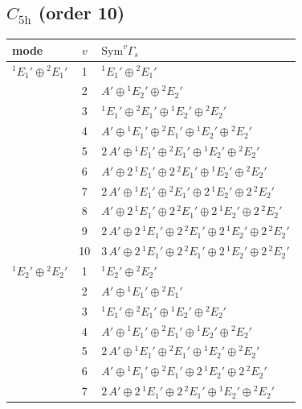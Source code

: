 \documentclass[11pt]{article}
\begin{document}
\subsection*{$C_{5\mathrm{h}}$ \quad (order 10)}
\begin{longtable}{l c p{}}
\hline mode & $v$ & $\mathrm{Sym}^v\Gamma_s$\\ \hline\endhead
${}^{1}E_{1}'\oplus {}^{2}E_{1}'$ & 1 & ${}^{1}E_{1}'\oplus {}^{2}E_{1}'$\\
 & 2 & $A'\oplus {}^{1}E_{2}'\oplus {}^{2}E_{2}'$\\
 & 3 & ${}^{1}E_{1}'\oplus {}^{2}E_{1}'\oplus {}^{1}E_{2}'\oplus {}^{2}E_{2}'$\\
 & 4 & $A'\oplus {}^{1}E_{1}'\oplus {}^{2}E_{1}'\oplus {}^{1}E_{2}'\oplus {}^{2}E_{2}'$\\
 & 5 & $2\,A'\oplus {}^{1}E_{1}'\oplus {}^{2}E_{1}'\oplus {}^{1}E_{2}'\oplus {}^{2}E_{2}'$\\
 & 6 & $A'\oplus 2\,{}^{1}E_{1}'\oplus 2\,{}^{2}E_{1}'\oplus {}^{1}E_{2}'\oplus {}^{2}E_{2}'$\\
 & 7 & $2\,A'\oplus {}^{1}E_{1}'\oplus {}^{2}E_{1}'\oplus 2\,{}^{1}E_{2}'\oplus 2\,{}^{2}E_{2}'$\\
 & 8 & $A'\oplus 2\,{}^{1}E_{1}'\oplus 2\,{}^{2}E_{1}'\oplus 2\,{}^{1}E_{2}'\oplus 2\,{}^{2}E_{2}'$\\
 & 9 & $2\,A'\oplus 2\,{}^{1}E_{1}'\oplus 2\,{}^{2}E_{1}'\oplus 2\,{}^{1}E_{2}'\oplus 2\,{}^{2}E_{2}'$\\
 & 10 & $3\,A'\oplus 2\,{}^{1}E_{1}'\oplus 2\,{}^{2}E_{1}'\oplus 2\,{}^{1}E_{2}'\oplus 2\,{}^{2}E_{2}'$\\
\hline
${}^{1}E_{2}'\oplus {}^{2}E_{2}'$ & 1 & ${}^{1}E_{2}'\oplus {}^{2}E_{2}'$\\
 & 2 & $A'\oplus {}^{1}E_{1}'\oplus {}^{2}E_{1}'$\\
 & 3 & ${}^{1}E_{1}'\oplus {}^{2}E_{1}'\oplus {}^{1}E_{2}'\oplus {}^{2}E_{2}'$\\
 & 4 & $A'\oplus {}^{1}E_{1}'\oplus {}^{2}E_{1}'\oplus {}^{1}E_{2}'\oplus {}^{2}E_{2}'$\\
 & 5 & $2\,A'\oplus {}^{1}E_{1}'\oplus {}^{2}E_{1}'\oplus {}^{1}E_{2}'\oplus {}^{2}E_{2}'$\\
 & 6 & $A'\oplus {}^{1}E_{1}'\oplus {}^{2}E_{1}'\oplus 2\,{}^{1}E_{2}'\oplus 2\,{}^{2}E_{2}'$\\
 & 7 & $2\,A'\oplus 2\,{}^{1}E_{1}'\oplus 2\,{}^{2}E_{1}'\oplus {}^{1}E_{2}'\oplus {}^{2}E_{2}'$\\

\end{longtable}
\end{document}
